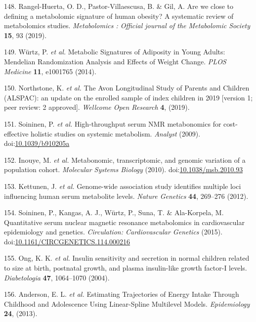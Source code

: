 \documentclass[11pt,twoside]{bristolthesis}
\begin{document}
\leavevmode\hypertarget{ref-Rangel-Huerta2019}{}%
148. Rangel-Huerta, O. D., Pastor-Villaescusa, B. \& Gil, A. Are we close to defining a metabolomic signature of human obesity? A systematic review of metabolomics studies. \emph{Metabolomics : Official journal of the Metabolomic Society} \textbf{15}, 93 (2019).

\leavevmode\hypertarget{ref-Wurtz2014}{}%
149. Würtz, P. \emph{et al.} Metabolic Signatures of Adiposity in Young Adults: Mendelian Randomization Analysis and Effects of Weight Change. \emph{PLOS Medicine} \textbf{11}, e1001765 (2014).

\leavevmode\hypertarget{ref-Northstone2019}{}%
150. Northstone, K. \emph{et al.} The Avon Longitudinal Study of Parents and Children (ALSPAC): an update on the enrolled sample of index children in 2019 {[}version 1; peer review: 2 approved{]}. \emph{Wellcome Open Research} \textbf{4}, (2019).

\leavevmode\hypertarget{ref-Soininen2009}{}%
151. Soininen, P. \emph{et al.} High-throughput serum NMR metabonomics for cost-effective holistic studies on systemic metabolism. \emph{Analyst} (2009). doi:\href{https://doi.org/10.1039/b910205a}{10.1039/b910205a}

\leavevmode\hypertarget{ref-Inouye2010}{}%
152. Inouye, M. \emph{et al.} Metabonomic, transcriptomic, and genomic variation of a population cohort. \emph{Molecular Systems Biology} (2010). doi:\href{https://doi.org/10.1038/msb.2010.93}{10.1038/msb.2010.93}

\leavevmode\hypertarget{ref-Kettunen2012}{}%
153. Kettunen, J. \emph{et al.} Genome-wide association study identifies multiple loci influencing human serum metabolite levels. \emph{Nature Genetics} \textbf{44}, 269--276 (2012).

\leavevmode\hypertarget{ref-Soininen2015}{}%
154. Soininen, P., Kangas, A. J., Würtz, P., Suna, T. \& Ala-Korpela, M. Quantitative serum nuclear magnetic resonance metabolomics in cardiovascular epidemiology and genetics. \emph{Circulation: Cardiovascular Genetics} (2015). doi:\href{https://doi.org/10.1161/CIRCGENETICS.114.000216}{10.1161/CIRCGENETICS.114.000216}

\leavevmode\hypertarget{ref-Ong2004}{}%
155. Ong, K. K. \emph{et al.} Insulin sensitivity and secretion in normal children related to size at birth, postnatal growth, and plasma insulin-like growth factor-I levels. \emph{Diabetologia} \textbf{47}, 1064--1070 (2004).

\leavevmode\hypertarget{ref-Anderson2013}{}%
156. Anderson, E. L. \emph{et al.} Estimating Trajectories of Energy Intake Through Childhood and Adolescence Using Linear-Spline Multilevel Models. \emph{Epidemiology} \textbf{24}, (2013).
\end{document}
